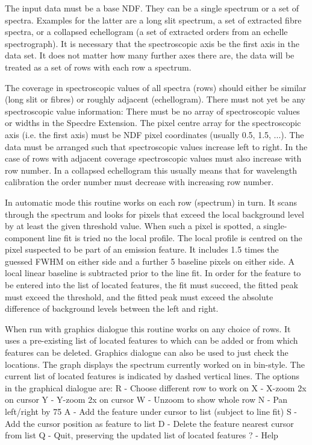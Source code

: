 \begin{description}
\begin{terminalv}
   The input data must be a base NDF. They can be a single spectrum
   or a set of spectra. Examples for the latter are a long slit
   spectrum, a set of extracted fibre spectra, or a collapsed
   echellogram (a set of extracted orders from an echelle
   spectrograph). It is necessary that the spectroscopic axis be the
   first axis in the data set. It does not matter how many further
   axes there are, the data will be treated as a set of rows with
   each row a spectrum.

   The coverage in spectroscopic values of all spectra (rows) should
   either be similar (long slit or fibres) or roughly adjacent
   (echellogram). There must not yet be any spectroscopic value
   information: There must be no array of spectroscopic values or
   widths in the Specdre Extension. The pixel centre array for the
   spectroscopic axis (i.e. the first axis) must be NDF pixel
   coordinates (usually 0.5, 1.5, ...). The data must be arranged
   such that spectroscopic values increase left to right. In the case
   of rows with adjacent coverage spectroscopic values must also
   increase with row number. In a collapsed echellogram this usually
   means that for wavelength calibration the order number must
   decrease with increasing row number.

   In automatic mode this routine works on each row (spectrum) in
   turn. It scans through the spectrum and looks for pixels that
   exceed the local background level by at least the given threshold
   value. When such a pixel is spotted, a single-component line fit
   is tried no the local profile. The local profile is centred on the
   pixel suspected to be part of an emission feature. It includes 1.5
   times the guessed FWHM on either side and a further 5 baseline
   pixels on either side. A local linear baseline is subtracted prior
   to the line fit. In order for the feature to be entered into the
   list of located features, the fit must succeed, the fitted peak
   must exceed the threshold, and the fitted peak must exceed the
   absolute difference of background levels between the left and
   right.

   When run with graphics dialogue this routine works on any choice
   of rows. It uses a pre-existing list of located features to which
   can be added or from which features can be deleted. Graphics
   dialogue can also be used to just check the locations. The graph
   displays the spectrum currently worked on in bin-style. The current
   list of located features is indicated by dashed vertical lines.
   The options in the graphical dialogue are:
      R - Choose different row to work on
      X - X-zoom 2x on cursor
      Y - Y-zoom 2x on cursor
      W - Unzoom to show whole row
      N - Pan left/right by 75%
      A - Add the feature under cursor to list (subject to line fit)
      S - Add the cursor position as feature to list
      D - Delete the feature nearest cursor from list
      Q - Quit, preserving the updated list of located features
      ? - Help


\end{terminalv}
\end{description}
